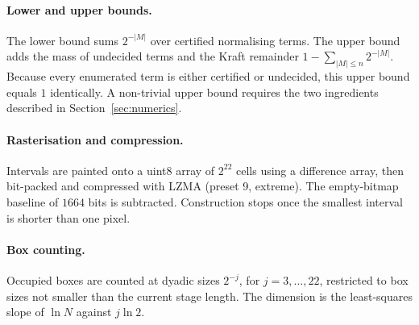 \documentclass[11pt]{article}
\theoremstyle{definition}\newtheorem{definition}{Definition}[section]
\theoremstyle{remark}\newtheorem*{remark}{Remark}
\begin{document}
\paragraph{Lower and upper bounds.} The lower bound sums $2^{-|M|}$ over certified normalising terms. The upper
bound adds the mass of undecided terms and the Kraft remainder $1-\sum_{|M|\le n}2^{-|M|}$. Because every enumerated
term is either certified or undecided, this upper bound equals $1$ identically. A non-trivial upper bound requires
the two ingredients described in Section~\ref{sec:numerics}.

\paragraph{Rasterisation and compression.} Intervals are painted onto a uint8 array of $2^{22}$ cells using a
difference array, then bit-packed and compressed with LZMA (preset 9, extreme). The empty-bitmap baseline of $1664$
bits is subtracted. Construction stops once the smallest interval is shorter than one pixel.

\paragraph{Box counting.} Occupied boxes are counted at dyadic sizes $2^{-j}$, for $j=3,\dots,22$, restricted to box
sizes not smaller than the current stage length. The dimension is the least-squares slope of $\ln N$ against
$j\ln2$.
\end{document}
